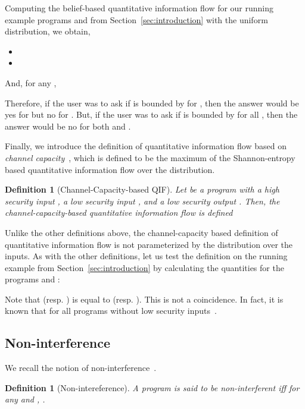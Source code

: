 \documentclass{llncs}
\newtheorem{definition}[theorem]{Definition}
\begin{document}
Computing the belief-based quantitative information flow for our
running example programs  and  from
Section~\ref{sec:introduction} with the uniform distribution, we
obtain,
\begin{itemize}
\item 


\item 

\end{itemize}
And, for any ,

Therefore, if the user was to ask if  is bounded
by  for , then the answer would be yes for  but no
for .  But, if the user was to ask if  is
bounded by  for all , then the answer would be no for both
 and .

Finally, we introduce the definition of quantitative information flow
based on {\em channel
  capacity}~\cite{mccamant:pldi2008,malacaria08,NMS2009}, which is
defined to be the maximum of the Shannon-entropy based quantitative
information flow over the distribution.
\begin{definition}[Channel-Capacity-based QIF]
Let  be a program with a high security input , a low security input
, and a low security output .  Then, the channel-capacity-based
quantitative information flow is defined

\end{definition}

Unlike the other definitions above, the channel-capacity based
definition of quantitative information flow is not parameterized by
the distribution over the inputs.  As with the other definitions, let
us test the definition on the running example from
Section~\ref{sec:introduction} by calculating the quantities for the
programs  and :

Note that  (resp. ) is equal to  (resp. ).  This is not a coincidence.
In fact, it is known that  for all
programs  without low security inputs~\cite{smith09}.

\subsection{Non-interference}

\label{sec:nonint}

We recall the notion of
non-interference~\cite{DBLP:conf/sosp/Cohen77,goguen:sp1982}.
\begin{definition}[Non-intereference]
A program  is said to be non-interferent iff for any  and , .
\end{definition}
\end{document}
